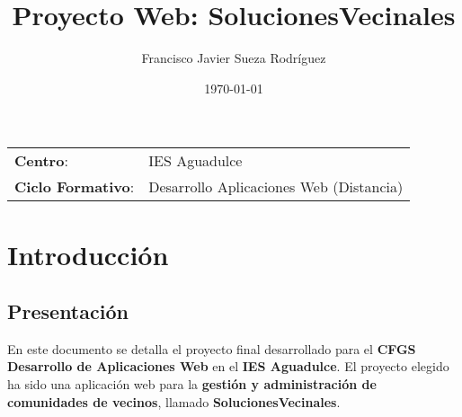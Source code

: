 


\title{
\vspace{10ex}
\normalfont \normalsize
\huge \textbf{Proyecto Web: SolucionesVecinales}
}
\author{Francisco Javier Sueza Rodríguez}
\date{\normalsize\today}




\maketitle

\thispagestyle{empty}

\vspace{80ex}

\begin{center}
    \begin{tabular}{l l}
        \textbf{Centro}: & IES Aguadulce \\
        \textbf{Ciclo Formativo}: & Desarrollo Aplicaciones Web (Distancia)\\
    \end{tabular}
\end{center}

\newpage

\tableofcontents

\newpage

\section{Introducción}

\subsection{Presentación}
En este documento se detalla el proyecto final desarrollado para el \textbf{CFGS Desarrollo de Aplicaciones Web} en el \textbf{IES Aguadulce}. El proyecto elegido ha sido una aplicación web para la \textbf{gestión y administración de comunidades de vecinos}, llamado \textbf{SolucionesVecinales}.

